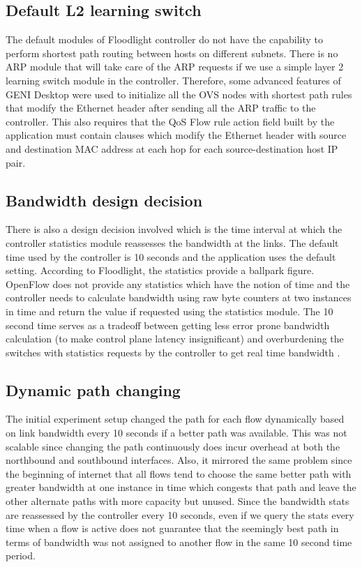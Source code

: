 \documentclass[paper=a4, fontsize=12pt]{scrartcl}	%
\numberwithin{equation}{section}		%
\numberwithin{figure}{section}			%
\numberwithin{table}{section}				%
\begin{document}
\subsection{Default L2 learning switch}
The default modules of Floodlight controller do not have the capability to perform shortest path routing between hosts on different subnets. There is no ARP module that will take care of the ARP requests if we use a simple layer 2 learning switch module in the controller. Therefore, some advanced features of GENI Desktop were used to initialize all the OVS nodes with shortest path rules that modify the Ethernet header after sending all the ARP traffic to the controller. This also requires that the QoS Flow rule action field built by the application must contain clauses which modify the Ethernet header with source and destination MAC address at each hop for each source-destination host IP pair.
\subsection{Bandwidth design decision}
There is also a design decision involved which is the time interval at which the controller statistics module reassesses the bandwidth at the links. The default time used by the controller is 10 seconds and the application uses the default setting. According to Floodlight, the statistics provide a ballpark figure. OpenFlow does not provide any statistics which have the notion of time and the controller needs to calculate bandwidth using raw byte counters at two instances in time and return the value if requested using the statistics module. The 10 second time serves as a tradeoff between getting less error prone bandwidth calculation (to make control plane latency insignificant) and overburdening the switches with statistics requests by the controller to get real time bandwidth \cite{stats}.
\subsection{Dynamic path changing}
The initial experiment setup changed the path for each flow dynamically based on link bandwidth every 10 seconds if a better path was available. This was not scalable since changing the path continuously does incur overhead at both the northbound and southbound interfaces. Also, it mirrored the same problem since the beginning of internet that all flows tend to choose the same better path with greater bandwidth at one instance in time which congests that path and leave the other alternate paths with more capacity but unused. Since the bandwidth stats are reassessed by the controller every 10 seconds, even if we query the stats every time when a flow is active does not guarantee that the seemingly best path in terms of bandwidth was not assigned to another flow in the same 10 second time period.
\end{document}
